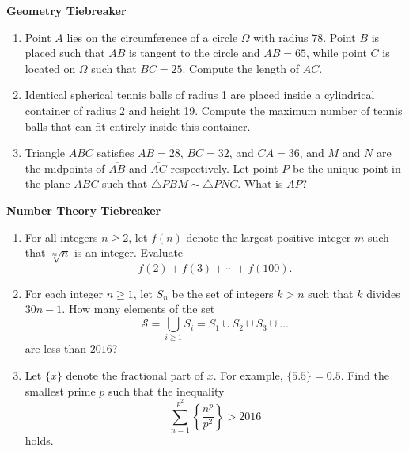 \documentclass[10pt]{article}
\begin{document}
\newpage

\begin{center}
\huge\textbf{Geometry Tiebreaker}\normalsize

\vspace{3pt}
\end{center}

\begin{enumerate}

\item Point $A$ lies on the circumference of a circle $\Omega$ with radius $78$.  Point $B$ is placed such that $AB$ is tangent to the circle and $AB=65$, while point $C$ is located on $\Omega$ such that $BC=25$.  Compute the length of $\overline{AC}$. %

\item Identical spherical tennis balls of radius 1 are placed inside a cylindrical container of radius 2 and height 19. Compute the maximum number of tennis balls that can fit entirely inside this container.

\item Triangle $ABC$ satisfies $AB=28$, $BC=32$, and $CA=36$, and $M$ and $N$ are the midpoints of $\overline{AB}$ and $\overline{AC}$ respectively.  Let point $P$ be the unique point in the plane $ABC$ such that $\triangle PBM\sim\triangle PNC$.  What is $AP$? %

\end{enumerate}

\newpage

\begin{center}
\huge\textbf{Number Theory Tiebreaker}\normalsize

\vspace{3pt}
\end{center}

\begin{enumerate}

\item For all integers $n\geq 2$, let $f(n)$ denote the largest positive integer $m$ such that $\sqrt[m]{n}$ is an integer.  Evaluate \[f(2)+f(3)+\cdots+f(100).\] %

\item For each integer $n\geq 1$, let $S_n$ be the set of integers $k > n$ such that $k$ divides $30n-1$.  How many elements of the set \[\mathcal{S} = \bigcup_{i\geq 1}S_i = S_1\cup S_2\cup S_3\cup\ldots\] are less than $2016$?

\item Let $\{x\}$ denote the fractional part of $x$.  For example, $\{5.5\}=0.5$.  Find the smallest prime $p$ such that the inequality \[\sum_{n=1}^{p^2}\left\{\dfrac{n^p}{p^2}\right\}>2016\] holds.

\end{enumerate}
\end{document}
